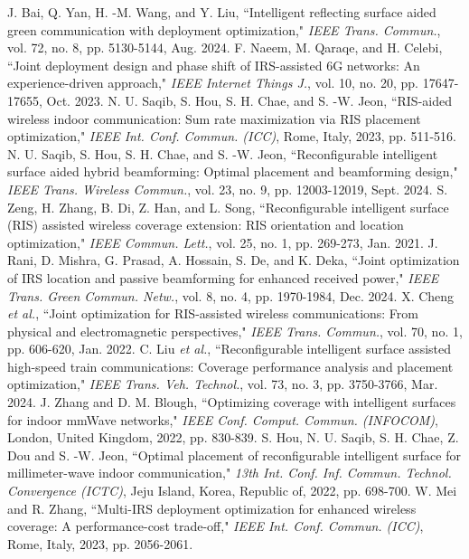 \documentclass{IEEEoj}
\begin{document}
\begin{thebibliography}{00}
	 J. Bai, Q. Yan, H. -M. Wang, and Y. Liu, “Intelligent reflecting surface aided green communication with deployment optimization," \textit{IEEE Trans. Commun.}, vol. 72, no. 8, pp. 5130-5144, Aug. 2024.
	 F. Naeem, M. Qaraqe, and H. Celebi, “Joint deployment design and phase shift of IRS-assisted 6G networks: An experience-driven approach," \textit{IEEE Internet Things J.}, vol. 10, no. 20, pp. 17647-17655, Oct. 2023.
	 N. U. Saqib, S. Hou, S. H. Chae, and S. -W. Jeon, “RIS-aided wireless indoor communication: Sum rate maximization via RIS placement optimization," \textit{IEEE Int. Conf. Commun. (ICC)}, Rome, Italy, 2023, pp. 511-516.
	 N. U. Saqib, S. Hou, S. H. Chae, and S. -W. Jeon, “Reconfigurable intelligent surface aided hybrid beamforming: Optimal placement and beamforming design," \textit{IEEE Trans. Wireless Commun.}, vol. 23, no. 9, pp. 12003-12019, Sept. 2024.
	 S. Zeng, H. Zhang, B. Di, Z. Han, and L. Song, “Reconfigurable intelligent surface (RIS) assisted wireless coverage extension: RIS orientation and location optimization," \textit{IEEE Commun. Lett.}, vol. 25, no. 1, pp. 269-273, Jan. 2021.
	 J. Rani, D. Mishra, G. Prasad, A. Hossain, S. De, and K. Deka, “Joint optimization of IRS location and passive beamforming for enhanced received power," \textit{IEEE Trans. Green Commun. Netw.}, vol. 8, no. 4, pp. 1970-1984, Dec. 2024.
	 X. Cheng \textit{et al.}, “Joint optimization for RIS-assisted wireless communications: From physical and electromagnetic perspectives," \textit{IEEE Trans. Commun.}, vol. 70, no. 1, pp. 606-620, Jan. 2022.
	 C. Liu \textit{et al.}, “Reconfigurable intelligent surface assisted high-speed train communications: Coverage performance analysis and placement optimization," \textit{IEEE Trans. Veh. Technol.}, vol. 73, no. 3, pp. 3750-3766, Mar. 2024.
	 J. Zhang and D. M. Blough, “Optimizing coverage with intelligent surfaces for indoor mmWave networks," \textit{IEEE Conf. Comput. Commun. (INFOCOM)}, London, United Kingdom, 2022, pp. 830-839.
	 S. Hou, N. U. Saqib, S. H. Chae, Z. Dou and S. -W. Jeon, “Optimal placement of reconfigurable intelligent surface for millimeter-wave indoor communication," \textit{13th Int. Conf. Inf. Commun. Technol. Convergence (ICTC)}, Jeju Island, Korea, Republic of, 2022, pp. 698-700.
	 W. Mei and R. Zhang, “Multi-IRS deployment optimization for enhanced wireless coverage: A performance-cost trade-off," \textit{IEEE Int. Conf. Commun. (ICC)}, Rome, Italy, 2023, pp. 2056-2061.

\end{thebibliography}
\end{document}
